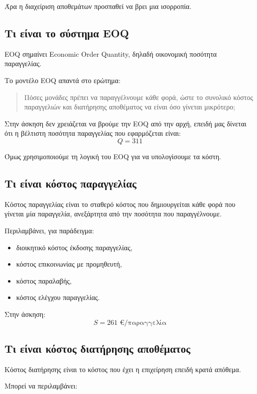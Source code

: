 \documentclass[12pt,a4paper]{article}
\begin{document}
Άρα η διαχείριση αποθεμάτων προσπαθεί να βρει μια ισορροπία.

\subsection{Τι είναι το σύστημα EOQ}

EOQ σημαίνει Economic Order Quantity, δηλαδή οικονομική ποσότητα παραγγελίας.

Το μοντέλο EOQ απαντά στο ερώτημα:

\begin{quote}
Πόσες μονάδες πρέπει να παραγγέλνουμε κάθε φορά, ώστε το συνολικό κόστος παραγγελιών και διατήρησης αποθέματος να είναι όσο γίνεται μικρότερο;
\end{quote}

Στην άσκηση δεν χρειάζεται να βρούμε την EOQ από την αρχή, επειδή μας δίνεται ότι η βέλτιστη ποσότητα παραγγελίας που εφαρμόζεται είναι:
\[
Q=311
\]

Όμως χρησιμοποιούμε τη λογική του EOQ για να υπολογίσουμε τα κόστη.

\subsection{Τι είναι κόστος παραγγελίας}

Κόστος παραγγελίας είναι το σταθερό κόστος που δημιουργείται κάθε φορά που γίνεται μία παραγγελία, ανεξάρτητα από την ποσότητα που παραγγέλνουμε.

Περιλαμβάνει, για παράδειγμα:

\begin{itemize}
    \item διοικητικό κόστος έκδοσης παραγγελίας,
    \item κόστος επικοινωνίας με προμηθευτή,
    \item κόστος παραλαβής,
    \item κόστος ελέγχου παραγγελίας.
\end{itemize}

Στην άσκηση:
\[
S=261 \text{ €/παραγγελία}
\]

\subsection{Τι είναι κόστος διατήρησης αποθέματος}

Κόστος διατήρησης είναι το κόστος που έχει η επιχείρηση επειδή κρατά απόθεμα.

Μπορεί να περιλαμβάνει:
\end{document}
